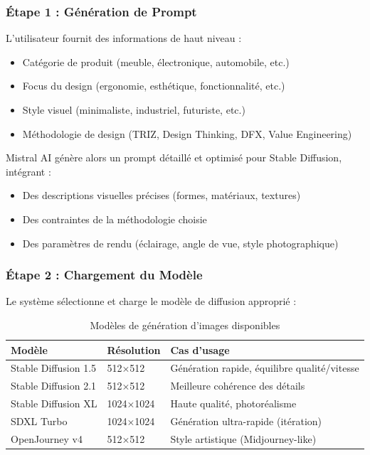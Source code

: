 \subsubsection{Étape 1 : Génération de Prompt}

L'utilisateur fournit des informations de haut niveau :
\begin{itemize}[leftmargin=*]
    \item Catégorie de produit (meuble, électronique, automobile, etc.)
    \item Focus du design (ergonomie, esthétique, fonctionnalité, etc.)
    \item Style visuel (minimaliste, industriel, futuriste, etc.)
    \item Méthodologie de design (TRIZ, Design Thinking, DFX, Value Engineering)
\end{itemize}

Mistral AI génère alors un prompt détaillé et optimisé pour Stable Diffusion, intégrant :
\begin{itemize}[leftmargin=*]
    \item Des descriptions visuelles précises (formes, matériaux, textures)
    \item Des contraintes de la méthodologie choisie
    \item Des paramètres de rendu (éclairage, angle de vue, style photographique)
\end{itemize}

\subsubsection{Étape 2 : Chargement du Modèle}

Le système sélectionne et charge le modèle de diffusion approprié :

\begin{table}[H]
\centering
\caption{Modèles de génération d'images disponibles}
\label{tab:models}
\begin{tabular}{@{}lll@{}}
\toprule
\textbf{Modèle} & \textbf{Résolution} & \textbf{Cas d'usage} \\ 
\midrule
Stable Diffusion 1.5 & 512×512 & Génération rapide, équilibre qualité/vitesse \\
Stable Diffusion 2.1 & 512×512 & Meilleure cohérence des détails \\
Stable Diffusion XL & 1024×1024 & Haute qualité, photoréalisme \\
SDXL Turbo & 1024×1024 & Génération ultra-rapide (itération) \\
OpenJourney v4 & 512×512 & Style artistique (Midjourney-like) \\
\bottomrule
\end{tabular}
\end{table}

